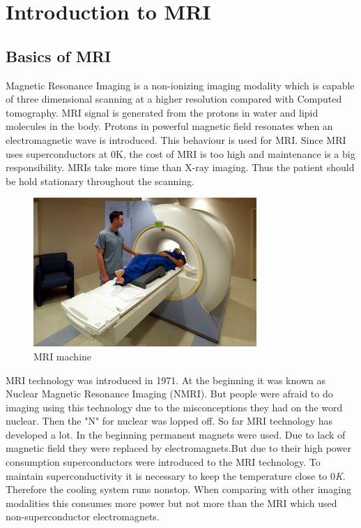 \documentclass[12pt]{article}
\def \topic{MRI}
\begin{document}

\tableofcontents
\pagebreak


\section{Introduction to \topic}
\subsection{Basics of \topic}
Magnetic Resonance Imaging is a non-ionizing imaging modality which is capable of three dimensional scanning at a higher resolution compared with Computed tomography. MRI signal is generated from the protons in water and lipid molecules in the body. Protons in powerful magnetic field resonates when an electromagnetic wave is introduced. This behaviour is used for MRI. Since MRI uses superconductors at 0K, the cost of MRI is too high and maintenance is a big responsibility. MRIs take more time than X-ray imaging. Thus the patient should be hold stationary throughout the scanning. 

\begin{figure}[h!]
  \centering
  \includegraphics[width=0.5\linewidth]{mri.jpg}
  \caption{\small{MRI machine}}
  \label{fig:MRI machine}
\end{figure}

MRI technology was introduced in 1971. At the beginning it was known as Nuclear Magnetic Resonance Imaging (NMRI). But people were afraid to do imaging using this technology due to the misconceptions they had on the word nuclear. Then the "N" for nuclear was lopped off. So far MRI technology has developed a lot. In the beginning permanent magnets were used. Due to lack of magnetic field they were replaced by electromagnets.But due to their high power consumption superconductors were introduced to the MRI technology. To maintain superconductivity it is necessary to keep the temperature close to 0\textit{K}. Therefore the cooling system runs nonstop. When comparing with other imaging modalities this consumes more power but not more than the MRI which used non-superconductor electromagnets. 
\end{document}
